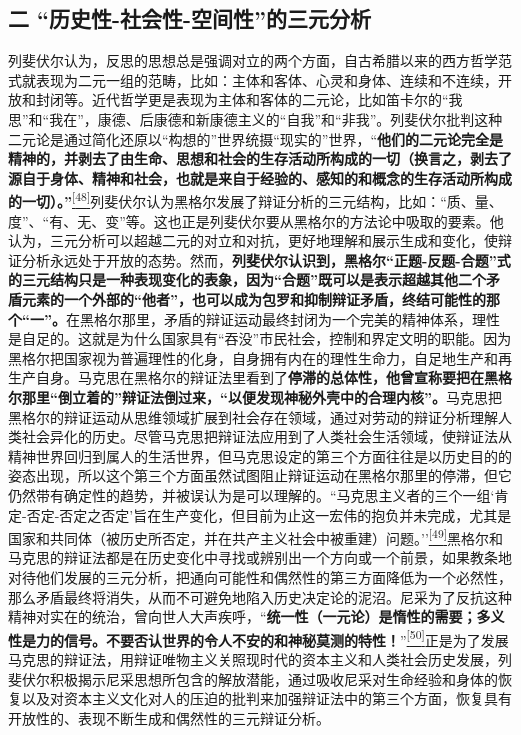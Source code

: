\documentclass[UTF8, fontset = sourcesans, a4paper, oneside, zihao =
-4, scheme=chinese, no-math, space=true]{ctexbook}
\begin{document}
\subsection{\texorpdfstring{二
``历史性-社会性-空间性''的三元分析}{二 历史性-社会性-空间性的三元分析}}\label{part0005_split_003.htmlux5cux23c011}

列斐伏尔认为，反思的思想总是强调对立的两个方面，自古希腊以来的西方哲学范式就表现为二元一组的范畴，比如：主体和客体、心灵和身体、连续和不连续，开放和封闭等。近代哲学更是表现为主体和客体的二元论，比如笛卡尔的``我思''和``我在''，康德、后康德和新康德主义的``自我''和``非我''。列斐伏尔批判这种二元论是通过简化还原以``构想的''世界统摄``现实的''世界，``\textbf{他们的二元论完全是精神的，并剥去了由生命、思想和社会的生存活动所构成的一切（换言之，剥去了源自于身体、精神和社会，也就是来自于经验的、感知的和概念的生存活动所构成的一切）。''}\protect\hypertarget{part0005_split_003.htmlux5cux23w48}{}{}\protect\hyperlink{part0005_split_003.htmlux5cux23m48}{\textsuperscript{{[}48{]}}}列斐伏尔认为黑格尔发展了辩证分析的三元结构，比如：``质、量、度''、``有、无、变''等。这也正是列斐伏尔要从黑格尔的方法论中吸取的要素。他认为，三元分析可以超越二元的对立和对抗，更好地理解和展示生成和变化，使辩证分析永远处于开放的态势。然而，\textbf{列斐伏尔认识到，黑格尔``正题-反题-合题''式的三元结构只是一种表现变化的表象，因为``合题''既可以是表示超越其他二个矛盾元素的一个外部的``他者''，也可以成为包罗和抑制辩证矛盾，终结可能性的那个``一''。}在黑格尔那里，矛盾的辩证运动最终封闭为一个完美的精神体系，理性是自足的。这就是为什么国家具有``吞没''市民社会，控制和界定文明的职能。因为黑格尔把国家视为普遍理性的化身，自身拥有内在的理性生命力，自足地生产和再生产自身。马克思在黑格尔的辩证法里看到了\textbf{停滞的总体性，他曾宣称要把在黑格尔那里``倒立着的''辩证法倒过来，``以便发现神秘外壳中的合理内核''。}马克思把黑格尔的辩证运动从思维领域扩展到社会存在领域，通过对劳动的辩证分析理解人类社会异化的历史。尽管马克思把辩证法应用到了人类社会生活领域，使辩证法从精神世界回归到属人的生活世界，但马克思设定的第三个方面往往是以历史目的的姿态出现，所以这个第三个方面虽然试图阻止辩证运动在黑格尔那里的停滞，但它仍然带有确定性的趋势，并被误认为是可以理解的。``马克思主义者的三个一组`肯定-否定-否定之否定'旨在生产变化，但目前为止这一宏伟的抱负并未完成，尤其是国家和共同体（被历史所否定，并在共产主义社会中被重建）问题。''\protect\hypertarget{part0005_split_003.htmlux5cux23w49}{}{}\protect\hyperlink{part0005_split_003.htmlux5cux23m49}{\textsuperscript{{[}49{]}}}黑格尔和马克思的辩证法都是在历史变化中寻找或辨别出一个方向或一个前景，如果教条地对待他们发展的三元分析，把通向可能性和偶然性的第三方面降低为一个必然性，那么矛盾最终将消失，从而不可避免地陷入历史决定论的泥沼。尼采为了反抗这种精神对实在的统治，曾向世人大声疾呼，``\textbf{统一性（一元论）是惰性的需要；多义性是力的信号。不要否认世界的令人不安的和神秘莫测的特性！}''\protect\hypertarget{part0005_split_003.htmlux5cux23w50}{}{}\protect\hyperlink{part0005_split_003.htmlux5cux23m50}{\textsuperscript{{[}50{]}}}正是为了发展马克思的辩证法，用辩证唯物主义关照现时代的资本主义和人类社会历史发展，列斐伏尔积极揭示尼采思想所包含的解放潜能，通过吸收尼采对生命经验和身体的恢复以及对资本主义文化对人的压迫的批判来加强辩证法中的第三个方面，恢复具有开放性的、表现不断生成和偶然性的三元辩证分析。
\end{document}
